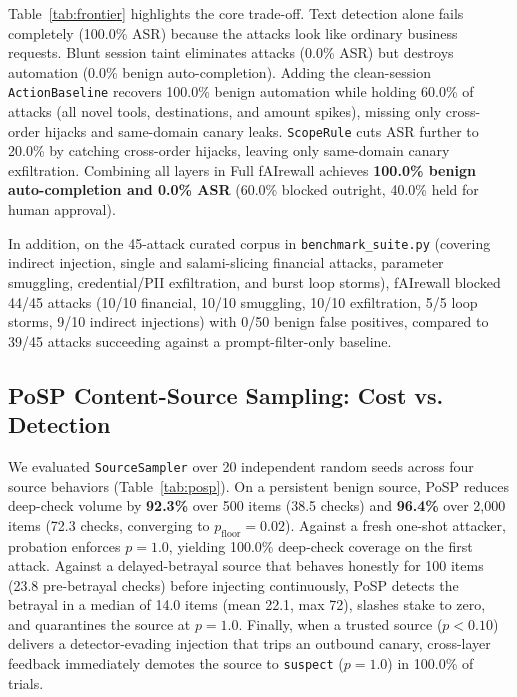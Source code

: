 \documentclass[conference]{IEEEtran}
\begin{document}
Table~\ref{tab:frontier} highlights the core trade-off. Text detection alone fails completely (100.0\% ASR) because the attacks look like ordinary business requests. Blunt session taint eliminates attacks (0.0\% ASR) but destroys automation (0.0\% benign auto-completion). Adding the clean-session \texttt{ActionBaseline} recovers 100.0\% benign automation while holding 60.0\% of attacks (all novel tools, destinations, and amount spikes), missing only cross-order hijacks and same-domain canary leaks. \texttt{ScopeRule} cuts ASR further to 20.0\% by catching cross-order hijacks, leaving only same-domain canary exfiltration. Combining all layers in Full fAIrewall achieves \textbf{100.0\% benign auto-completion and 0.0\% ASR} (60.0\% blocked outright, 40.0\% held for human approval).

In addition, on the 45-attack curated corpus in \texttt{benchmark\_suite.py} (covering indirect injection, single and salami-slicing financial attacks, parameter smuggling, credential/PII exfiltration, and burst loop storms), fAIrewall blocked 44/45 attacks (10/10 financial, 10/10 smuggling, 10/10 exfiltration, 5/5 loop storms, 9/10 indirect injections) with 0/50 benign false positives, compared to 39/45 attacks succeeding against a prompt-filter-only baseline.

\subsection{PoSP Content-Source Sampling: Cost vs. Detection}
We evaluated \texttt{SourceSampler} over 20 independent random seeds across four source behaviors (Table~\ref{tab:posp}). On a persistent benign source, PoSP reduces deep-check volume by \textbf{92.3\%} over 500 items (38.5 checks) and \textbf{96.4\%} over 2,000 items (72.3 checks, converging to $p_{\text{floor}} = 0.02$). Against a fresh one-shot attacker, probation enforces $p=1.0$, yielding 100.0\% deep-check coverage on the first attack. Against a delayed-betrayal source that behaves honestly for 100 items (23.8 pre-betrayal checks) before injecting continuously, PoSP detects the betrayal in a median of 14.0 items (mean 22.1, max 72), slashes stake to zero, and quarantines the source at $p=1.0$. Finally, when a trusted source ($p < 0.10$) delivers a detector-evading injection that trips an outbound canary, cross-layer feedback immediately demotes the source to \texttt{suspect} ($p=1.0$) in 100.0\% of trials.
\end{document}
